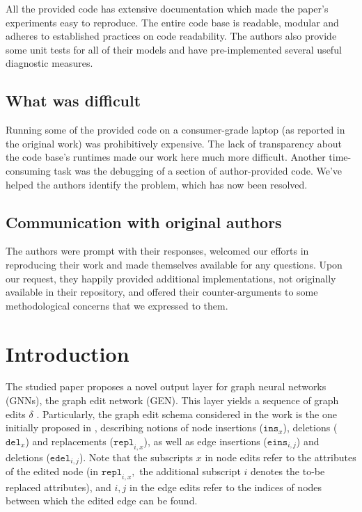 All the provided code has extensive documentation which made the paper's experiments easy to reproduce. The entire code base is readable, modular and adheres to established practices on code readability. The authors also provide some unit tests for all of their models and have pre-implemented several useful diagnostic measures.


\subsection*{What was difficult}


Running some of the provided code on a consumer-grade laptop (as reported in the original work) was prohibitively expensive. The lack of transparency about the code base's runtimes made our work here much more difficult. Another time-consuming task was the debugging of a section of author-provided code. We've helped the authors identify the problem, which has now been resolved.

\subsection*{Communication with original authors}

The authors were prompt with their responses, welcomed our efforts in reproducing their work and made themselves available for any questions. Upon our request, they happily provided additional implementations, not originally available in their repository, and offered their counter-arguments to some methodological concerns that we expressed to them.

\section{Introduction}



The studied paper proposes a novel output layer for graph neural networks (GNNs), the graph edit network (GEN). This layer yields a sequence of graph edits $\delta$ .
Particularly, the graph edit schema considered in the work is the one initially proposed in \cite{sanfeliu1983distance}, describing notions of node insertions ($\texttt{ins}_{x}$), deletions ($\texttt{del}_{x}$) and replacements ($\texttt{repl}_{i,x}$), as well as edge insertions ($\texttt{eins}_{i,j}$) and deletions ($\texttt{edel}_{i,j}$). Note that the subscripts $x$ in node edits refer to the attributes of the edited node (in $\texttt{repl}_{i,x},$ the additional subscript $i$ denotes the to-be replaced attributes), and $i,j$ in the edge edits refer to the indices of nodes between which the edited edge can be found. 

